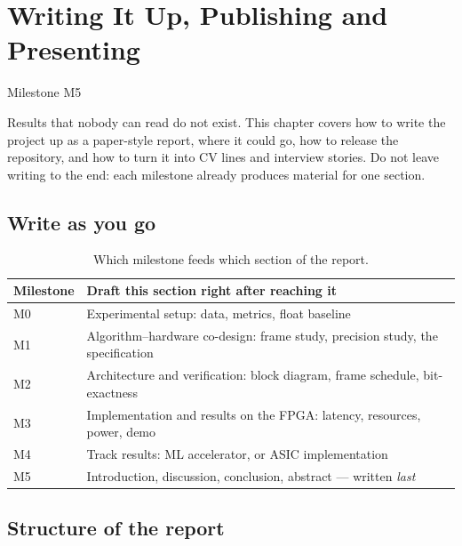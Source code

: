 \chapter{Writing It Up, Publishing and Presenting}\label{ch:writeup}

 \quad Milestone M5

Results that nobody can read do not exist. This chapter covers how to write the
project up as a paper-style report, where it could go, how to release the
repository, and how to turn it into CV lines and interview stories. Do not leave
writing to the end: each milestone already produces material for one section.

\section{Write as you go}\label{sec:writeup:asyougo}

\begin{table}[htbp]
\centering\small
\caption{Which milestone feeds which section of the report.}
\label{tab:writeup:sections}
\begin{tabularx}{\textwidth}{@{}lL@{}}
\toprule
Milestone & Draft this section right after reaching it \\
\midrule
M0 & Experimental setup: data, metrics, float baseline \\
M1 & Algorithm--hardware co-design: frame study, precision study, the specification \\
M2 & Architecture and verification: block diagram, frame schedule, bit-exactness \\
M3 & Implementation and results on the FPGA: latency, resources, power, demo \\
M4 & Track results: ML accelerator, or ASIC implementation \\
M5 & Introduction, discussion, conclusion, abstract --- written \emph{last} \\
\bottomrule
\end{tabularx}
\end{table}

\section{Structure of the report}\label{sec:writeup:structure}

